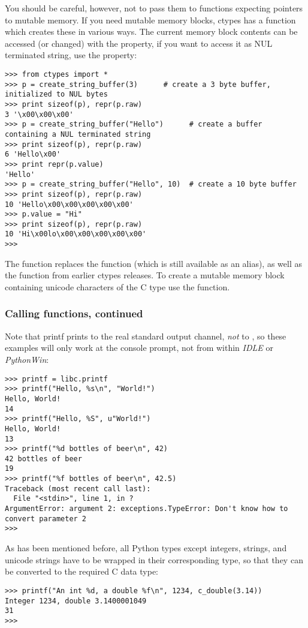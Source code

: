 You should be careful, however, not to pass them to functions
expecting pointers to mutable memory. If you need mutable memory
blocks, ctypes has a  function which creates
these in various ways.  The current memory block contents can be
accessed (or changed) with the  property, if you want to access
it as NUL terminated string, use the  property:
\begin{verbatim}
>>> from ctypes import *
>>> p = create_string_buffer(3)      # create a 3 byte buffer, initialized to NUL bytes
>>> print sizeof(p), repr(p.raw)
3 '\x00\x00\x00'
>>> p = create_string_buffer("Hello")      # create a buffer containing a NUL terminated string
>>> print sizeof(p), repr(p.raw)
6 'Hello\x00'
>>> print repr(p.value)
'Hello'
>>> p = create_string_buffer("Hello", 10)  # create a 10 byte buffer
>>> print sizeof(p), repr(p.raw)
10 'Hello\x00\x00\x00\x00\x00'
>>> p.value = "Hi"      
>>> print sizeof(p), repr(p.raw)
10 'Hi\x00lo\x00\x00\x00\x00\x00'
>>>
\end{verbatim}

The  function replaces the 
function (which is still available as an alias), as well as the
 function from earlier ctypes releases.  To create a
mutable memory block containing unicode characters of the C type
 use the  function.


\subsubsection{Calling functions, continued\label{ctypes-calling-functions-continued}}

Note that printf prints to the real standard output channel, \emph{not} to
, so these examples will only work at the console
prompt, not from within \emph{IDLE} or \emph{PythonWin}:
\begin{verbatim}
>>> printf = libc.printf
>>> printf("Hello, %s\n", "World!")
Hello, World!
14
>>> printf("Hello, %S", u"World!")
Hello, World!
13
>>> printf("%d bottles of beer\n", 42)
42 bottles of beer
19
>>> printf("%f bottles of beer\n", 42.5)
Traceback (most recent call last):
  File "<stdin>", line 1, in ?
ArgumentError: argument 2: exceptions.TypeError: Don't know how to convert parameter 2
>>>
\end{verbatim}

As has been mentioned before, all Python types except integers,
strings, and unicode strings have to be wrapped in their corresponding
 type, so that they can be converted to the required C data
type:
\begin{verbatim}
>>> printf("An int %d, a double %f\n", 1234, c_double(3.14))
Integer 1234, double 3.1400001049
31
>>>
\end{verbatim}


